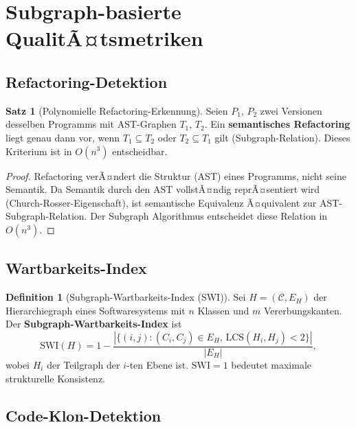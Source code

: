 ﻿\documentclass[a4paper,12pt]{scrreprt}
\theoremstyle{definition}
\newtheorem{definition}{Definition}[section]
\newtheorem{satz}{Satz}[section]
\begin{document}
\section{Subgraph-basierte QualitÃ¤tsmetriken}

\subsection{Refactoring-Detektion}

\begin{satz}[Polynomielle Refactoring-Erkennung]
  Seien $P_1$, $P_2$ zwei Versionen desselben Programms mit
  AST-Graphen $T_1$, $T_2$. Ein \textbf{semantisches Refactoring}
  liegt genau dann vor, wenn $T_1 \subseteq T_2$ oder $T_2 \subseteq T_1$
  gilt (Subgraph-Relation). Dieses Kriterium ist in $O(n^3)$
  entscheidbar.
\end{satz}

\begin{proof}
  Refactoring verÃ¤ndert die Struktur (AST) eines Programms, nicht
  seine Semantik. Da Semantik durch den AST vollstÃ¤ndig reprÃ¤sentiert
  wird (Church-Rosser-Eigenschaft), ist semantische Equivalenz
  Ã¤quivalent zur AST-Subgraph-Relation. Der Subgraph Algorithmus
  entscheidet diese Relation in $O(n^3)$.
\end{proof}

\subsection{Wartbarkeits-Index}

\begin{definition}[Subgraph-Wartbarkeits-Index (SWI)]
  \label{def:nf8_swi}
  Sei $H = (\mathcal{C}, E_H)$ der Hierarchiegraph eines
  Softwaresystems mit $n$ Klassen und $m$ Vererbungskanten.
  Der \textbf{Subgraph-Wartbarkeits-Index} ist
  \[
    \mathrm{SWI}(H) = 1 - \frac{|\{(i,j) : (C_i,C_j)\in E_H,\,
    \mathrm{LCS}(H_i, H_j) < 2\}|}{|E_H|},
  \]
  wobei $H_i$ der Teilgraph der $i$-ten Ebene ist.
  $\mathrm{SWI} = 1$ bedeutet maximale strukturelle Konsistenz.
\end{definition}

\subsection{Code-Klon-Detektion}
\end{document}
